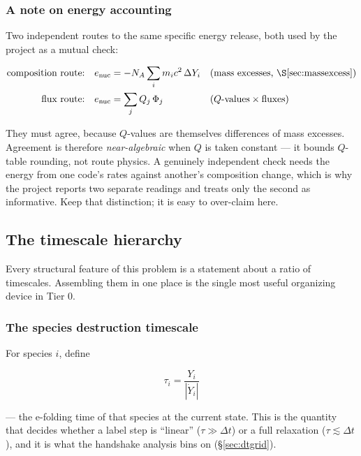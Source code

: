 \subsubsection{A note on energy accounting}
\label{sec:energyaccounting}

Two independent routes to the same specific energy release, both used by the
project as a mutual check:

\begin{align*}
\text{composition route:}\quad \enuc &= -N_A\sum_i m_i c^2\,\Delta Y_i
  && \text{(mass excesses, \S\ref{sec:massexcess})}\\
\text{flux route:}\quad \enuc &= \sum_j Q_j\,\Phi_j
  && \text{($Q$-values} \times \text{fluxes)}
\end{align*}

They must agree, because $Q$-values are themselves differences of mass excesses.
Agreement is therefore \emph{near-algebraic} when $Q$ is taken constant --- it
bounds $Q$-table rounding, not route physics. A genuinely independent check
needs the energy from one code's rates against another's composition change,
which is why the project reports two separate readings and treats only the
second as informative. Keep that distinction; it is easy to over-claim here.

\subsection{The timescale hierarchy}
\label{sec:timescales}

Every structural feature of this problem is a statement about a ratio of
timescales. Assembling them in one place is the single most useful organizing
device in Tier 0.

\subsubsection{The species destruction timescale}
\label{sec:tauspecies}

For species $i$, define

\begin{equation}
\tau_i = \frac{Y_i}{|\dot{Y}_i|}
\label{eq:tau-species}
\end{equation}

--- the e-folding time of that species at the current state. This is the
quantity that decides whether a label step is ``linear'' ($\tau \gg \Delta t$)
or a full relaxation ($\tau \lesssim \Delta t$), and it is what the handshake
analysis bins on (\S\ref{sec:dtgrid}).

